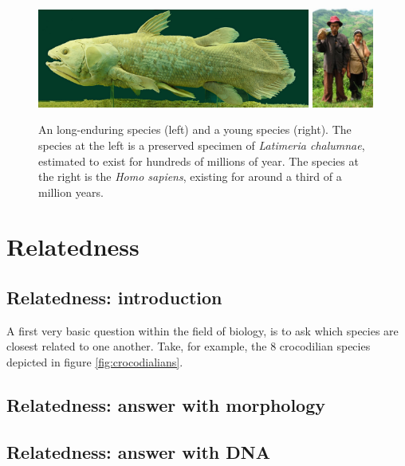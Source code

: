 \begin{figure}[H]
  \includegraphics[width=0.80\textwidth]{latimeria_chalumnae.jpg}
  \includegraphics[width=0.18\textwidth]{homo_sapiens.jpg}
  \caption{
    An long-enduring species (left) and a young species (right).
    The species at the left is a preserved specimen of \textit{Latimeria chalumnae}, 
    estimated to exist for hundreds of millions of year.
    The species at the right is the \textit{Homo sapiens}, 
    existing for around a third of a million years.
  }
  \label{fig:long_enduring_and_young_species}
\end{figure}

\section{Relatedness}

\subsection{Relatedness: introduction}

A first very basic question within the field of biology,
is to ask which species are closest related to
one another. Take, for example, the 8 crocodilian species 
depicted in figure \ref{fig:crocodialians}.

\subsection{Relatedness: answer with morphology}

\subsection{Relatedness: answer with DNA}


